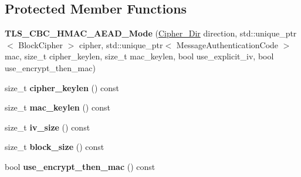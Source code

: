 \subsection*{Protected Member Functions}
\begin{DoxyCompactItemize}
\item 
\mbox{\label{class_botan_1_1_t_l_s_1_1_t_l_s___c_b_c___h_m_a_c___a_e_a_d___mode_aefe8d7dd30342fbf94e94aa0d2b3c912}} 
{\bfseries T\+L\+S\+\_\+\+C\+B\+C\+\_\+\+H\+M\+A\+C\+\_\+\+A\+E\+A\+D\+\_\+\+Mode} (\mbox{\hyperlink{namespace_botan_a8d9547a8fb3e868810b169b20ac389ee}{Cipher\+\_\+\+Dir}} direction, std\+::unique\+\_\+ptr$<$ Block\+Cipher $>$ cipher, std\+::unique\+\_\+ptr$<$ Message\+Authentication\+Code $>$ mac, size\+\_\+t cipher\+\_\+keylen, size\+\_\+t mac\+\_\+keylen, bool use\+\_\+explicit\+\_\+iv, bool use\+\_\+encrypt\+\_\+then\+\_\+mac)
\item 
\mbox{\label{class_botan_1_1_t_l_s_1_1_t_l_s___c_b_c___h_m_a_c___a_e_a_d___mode_aad65e893caa6ef33fb4bab36d639c4dd}} 
size\+\_\+t {\bfseries cipher\+\_\+keylen} () const
\item 
\mbox{\label{class_botan_1_1_t_l_s_1_1_t_l_s___c_b_c___h_m_a_c___a_e_a_d___mode_a0d2ca0c41795e0270685b2797b6adc04}} 
size\+\_\+t {\bfseries mac\+\_\+keylen} () const
\item 
\mbox{\label{class_botan_1_1_t_l_s_1_1_t_l_s___c_b_c___h_m_a_c___a_e_a_d___mode_ae8f27454bed57c44e19a8f015d1d43e7}} 
size\+\_\+t {\bfseries iv\+\_\+size} () const
\item 
\mbox{\label{class_botan_1_1_t_l_s_1_1_t_l_s___c_b_c___h_m_a_c___a_e_a_d___mode_a065ee0e8519b8864d9e96e49ed27ee41}} 
size\+\_\+t {\bfseries block\+\_\+size} () const
\item 
\mbox{\label{class_botan_1_1_t_l_s_1_1_t_l_s___c_b_c___h_m_a_c___a_e_a_d___mode_a722944b59c1db8e59f07fce027fab859}} 
bool {\bfseries use\+\_\+encrypt\+\_\+then\+\_\+mac} () const

\end{DoxyCompactItemize}
